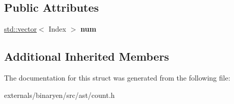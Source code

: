 \subsection*{Public Attributes}
\begin{DoxyCompactItemize}
\item 
\mbox{\label{structwasm_1_1_get_local_counter_a31d4c12360e8a91da7366a15a4d9f429}} 
\mbox{\hyperlink{classstd_1_1vector}{std\+::vector}}$<$ Index $>$ {\bfseries num}
\end{DoxyCompactItemize}
\subsection*{Additional Inherited Members}


The documentation for this struct was generated from the following file\+:\begin{DoxyCompactItemize}
\item 
externals/binaryen/src/ast/count.\+h\end{DoxyCompactItemize}
